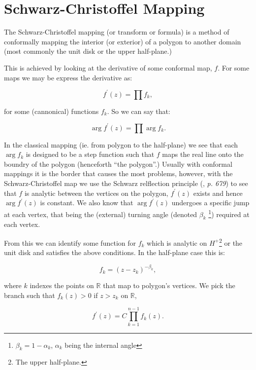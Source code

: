 \documentclass[a4paper,10pt]{amsart}
\newcommand{\sch}{Schwarz-Christoffel }
\newcommand{\fprime}{f^\prime(z)}
\begin{document}
 
\section{\sch Mapping}

The \sch mapping (or transform or formula) is a method of conformally mapping the interior (or exterior) of a polygon to another domain (most commonly the unit disk or the upper half-plane.)

This is achieved by looking at the derivative of some conformal map, $f$. For some maps we may be express the derivative as:

\begin{equation}
\fprime = \prod f_k,
\end{equation}

for some (cannonical) functions $f_k$. So we can say that:

\begin{equation}
\arg \fprime = \prod \arg f_k.
\end{equation}

In the classical mapping (ie. from polygon to the half-plane) we see that each $\arg f_k$ is designed to be a step function such that $f$ maps the real line onto the boundry of the polygon (henceforth ``the polygon''.) Usually with conformal mappings it is the border that causes the most problems, however, with the \sch map we use the Schwarz relflection principle (\cite{handbuch}, \emph{p. 679}) to see that $f$ is analytic between the vertices on the polygon, $\fprime$ exists and hence $\arg \fprime$ is constant. We also know that $\arg \fprime$ undergoes a specific jump at each vertex, that being the (external) turning angle (denoted $\beta_k$ \footnote{$\beta_k = 1-\alpha_k$, $\alpha_k$ being the internal angle}) required at each vertex. 

From this we can identify some function for $f_k$ which is analytic on $H^+$\footnote{The upper half-plane.} or the unit disk and satisfies the above conditions. In the half-plane case this is:

\begin{equation}
\label{halfplanefunc}
f_k = (z-z_k)^{-\beta_k},
\end{equation}

where $k$ indexes the points on $\mathbb{R}$ that map to polygon's vertices. We pick the branch such that $f_k(z)>0$ if $z>z_k$ on $\mathbb{R}$,

\begin{equation}
\fprime = C \prod_{k=1}^{n-1} f_k(z).
\end{equation}
\end{document}
